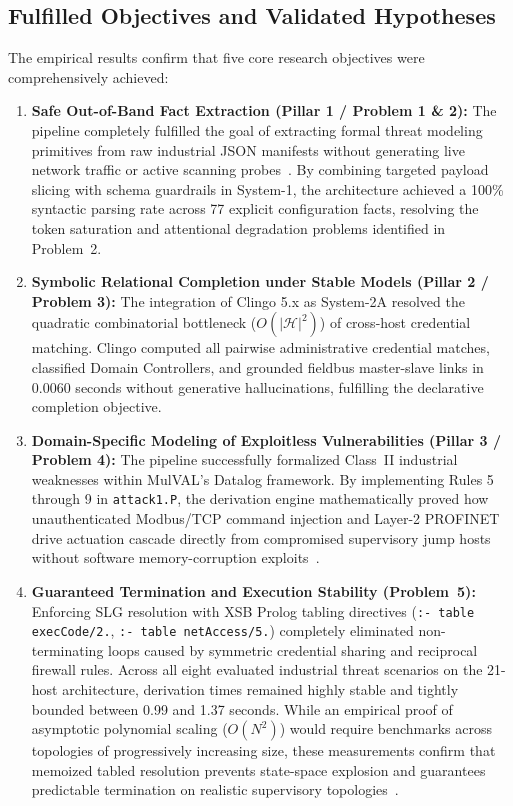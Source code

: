 \documentclass[target=mst,aauheader=aics,style=]{thud}
\begin{document}
\subsection{Fulfilled Objectives and Validated Hypotheses}
The empirical results confirm that five core research objectives were comprehensively achieved:
\begin{enumerate}
    \item \textbf{Safe Out-of-Band Fact Extraction (Pillar 1 / Problem 1 \& 2):} The pipeline completely fulfilled the goal of extracting formal threat modeling primitives from raw industrial JSON manifests without generating live network traffic or active scanning probes~\cite{Ou05, alviano2025llmasp}. By combining targeted payload slicing with schema guardrails in System-1, the architecture achieved a 100\% syntactic parsing rate across 77 explicit configuration facts, resolving the token saturation and attentional degradation problems identified in Problem~2.
    \item \textbf{Symbolic Relational Completion under Stable Models (Pillar 2 / Problem 3):} The integration of Clingo 5.x as System-2A resolved the quadratic combinatorial bottleneck ($O(|\mathcal{H}|^2)$) of cross-host credential matching. Clingo computed all pairwise administrative credential matches, classified Domain Controllers, and grounded fieldbus master-slave links in $0.0060$ seconds without generative hallucinations, fulfilling the declarative completion objective.
    \item \textbf{Domain-Specific Modeling of Exploitless Vulnerabilities (Pillar 3 / Problem 4):} The pipeline successfully formalized Class~II industrial weaknesses within MulVAL's Datalog framework. By implementing Rules 5 through 9 in \texttt{attack1.P}, the derivation engine mathematically proved how unauthenticated Modbus/TCP command injection and Layer-2 PROFINET drive actuation cascade directly from compromised supervisory jump hosts without software memory-corruption exploits~\cite{StanExtended, SunderOT}.
    \item \textbf{Guaranteed Termination and Execution Stability (Problem~5):} Enforcing SLG resolution with XSB Prolog tabling directives (\texttt{:- table execCode/2.}, \texttt{:- table netAccess/5.}) completely eliminated non-terminating loops caused by symmetric credential sharing and reciprocal firewall rules. Across all eight evaluated industrial threat scenarios on the 21-host architecture, derivation times remained highly stable and tightly bounded between 0.99 and 1.37 seconds. While an empirical proof of asymptotic polynomial scaling ($O(N^2)$) would require benchmarks across topologies of progressively increasing size, these measurements confirm that memoized tabled resolution prevents state-space explosion and guarantees predictable termination on realistic supervisory topologies~\cite{swift2012xsb}.

\end{enumerate}
\end{document}
